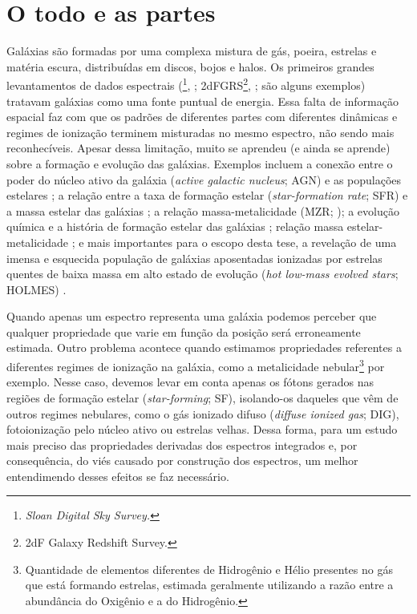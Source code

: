 \section{O todo e as partes}
\label{sec:intro:partes}

Galáxias são formadas por uma complexa mistura de gás, poeira, estrelas e matéria escura, distribuídas em discos, bojos e halos. Os primeiros grandes levantamentos de dados espectrais (\SDSS\footnote{\em Sloan Digital Sky Survey.}, \citealt{York.etal.2000a}; 2dFGRS\footnote{2dF Galaxy Redshift Survey.}, \citealt{Colless.etal.2001a}; são alguns exemplos) tratavam galáxias como uma fonte puntual de energia. Essa falta de informação espacial faz com que os padrões de diferentes partes com diferentes dinâmicas e regimes de ionização terminem misturadas no mesmo espectro, não sendo mais reconhecíveis. Apesar dessa limitação, muito se aprendeu (e ainda se aprende) sobre a formação e evolução das galáxias. Exemplos incluem a conexão entre o poder do núcleo ativo da galáxia ({\em active galactic nucleus}; AGN) e as populações estelares \citep{Kauffmann.etal.2003a}; a relação entre a taxa de formação estelar ({\em star-formation rate}; SFR) e a massa estelar das galáxias \citep{Brinchmann.etal.2004a}; a relação massa-metalicidade (MZR; \citealt{Tremonti.etal.2004a}); a evolução química e a história de formação estelar das galáxias \citep{CidFernandes.etal.2007, Asari.etal.2007a}; relação massa estelar-metalicidade \citep{ValeAsari.etal.2009a}; e mais importantes para o escopo desta tese, a revelação de uma imensa e esquecida população de galáxias aposentadas ionizadas por estrelas quentes de baixa massa em alto estado de evolução ({\em hot low-mass evolved stars}; HOLMES) \citep{Stasinska.etal.2008a, CidFernandes.etal.2010a, CidFernandes.etal.2011a}.

Quando apenas um espectro representa uma galáxia podemos perceber que qualquer propriedade que varie em função da posição será erroneamente estimada. Outro problema acontece quando estimamos propriedades referentes a diferentes regimes de ionização na galáxia, como a metalicidade nebular\footnote{Quantidade de elementos diferentes de Hidrogênio e Hélio presentes no gás que está formando estrelas, estimada geralmente utilizando a razão entre a abundância do Oxigênio e a do Hidrogênio.} por exemplo. Nesse caso, devemos levar em conta apenas os fótons gerados nas regiões de formação estelar ({\em star-forming}; SF), isolando-os daqueles que vêm de outros regimes nebulares, como o gás ionizado difuso ({\em diffuse ionized gas}; DIG), fotoionização pelo núcleo ativo ou estrelas velhas. Dessa forma, para um estudo mais preciso das propriedades derivadas dos espectros integrados e, por consequência, do viés causado por construção dos espectros, um melhor entendimendo desses efeitos se faz necessário.

